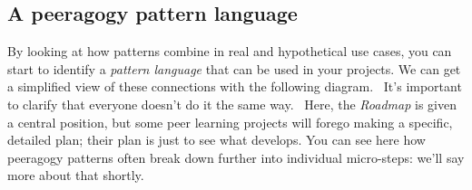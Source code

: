 \subsection{A peeragogy pattern
language}\label{a-peeragogy-pattern-language}

By looking at how patterns combine in real and hypothetical use cases,
you can start to identify a \emph{pattern language} that can be used in
your projects. We can get a simplified view of these connections with
the following diagram.~ It's important to clarify that everyone doesn't
do it the same way.~ Here, the \emph{Roadmap} is given a central
position, but some peer learning projects will forego making a specific,
detailed plan; their plan is just to see what develops. You can see here
how peeragogy patterns often break down further into individual
micro-steps: we'll say more about that shortly.

